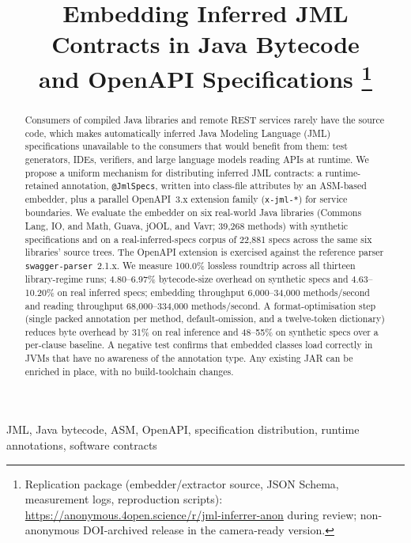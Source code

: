 \documentclass[conference]{IEEEtran}
\begin{document}
\title{Embedding Inferred JML Contracts in Java Bytecode\\
       and OpenAPI Specifications%
\thanks{Replication package (embedder/extractor source, JSON Schema, measurement logs, reproduction scripts): \url{https://anonymous.4open.science/r/jml-inferrer-anon} during review; non-anonymous DOI-archived release in the camera-ready version.}}

\author{%
}

\maketitle

\begin{abstract}
Consumers of compiled Java libraries and remote REST services rarely
have the source code, which makes automatically inferred Java
Modeling Language (JML) specifications unavailable to the consumers
that would benefit from them: test generators, IDEs, verifiers, and
large language models reading APIs at runtime. We propose a uniform
mechanism for distributing inferred JML contracts: a runtime-retained
annotation, \texttt{@JmlSpecs}, written into class-file attributes by
an ASM-based embedder, plus a parallel OpenAPI~3.x extension family
(\texttt{x-jml-*}) for service boundaries. We evaluate the embedder
on six real-world Java libraries (Commons Lang, IO, and Math, Guava,
jOOL, and Vavr; 39{,}268 methods) with synthetic specifications and
on a real-inferred-specs corpus of 22{,}881 specs across the same
six libraries' source trees. The OpenAPI extension is exercised
against the reference parser \texttt{swagger-parser}~2.1.x. We
measure 100.0\% lossless roundtrip across all thirteen
library-regime runs; 4.80--6.97\% bytecode-size overhead on
synthetic specs and 4.63--10.20\% on real inferred specs; embedding
throughput 6{,}000--34{,}000 methods/second and reading throughput
68{,}000--334{,}000 methods/second. A format-optimisation step
(single packed annotation per method, default-omission, and a
twelve-token dictionary) reduces byte overhead by 31\% on real
inference and 48--55\% on synthetic specs over a per-clause baseline.
A negative test confirms that embedded classes load correctly in
JVMs that have no awareness of the annotation type. Any existing JAR
can be enriched in place, with no build-toolchain changes.
\end{abstract}

\begin{IEEEkeywords}
JML, Java bytecode, ASM, OpenAPI, specification distribution, runtime
annotations, software contracts
\end{IEEEkeywords}











\newpage


\end{document}
